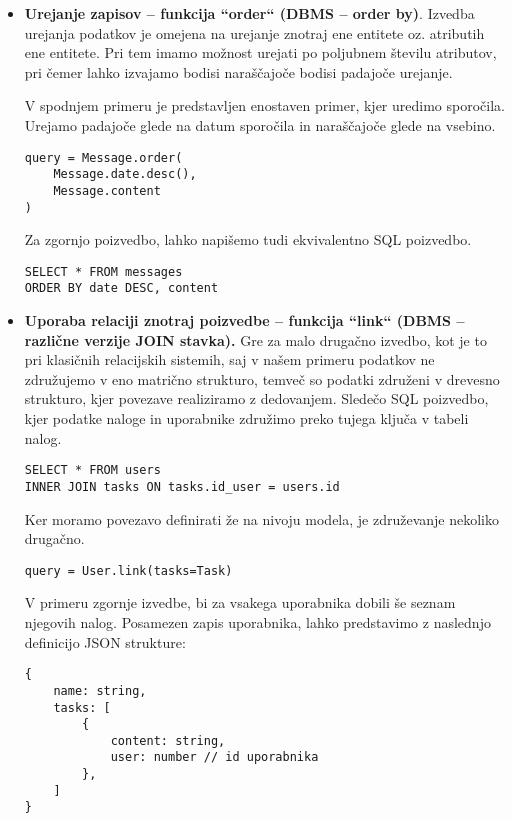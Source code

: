 \documentclass[a4paper,12pt,openright]{book}
\begin{document}
\begin{itemize}
        \item \textbf{Urejanje zapisov – funkcija ``order`` (DBMS – order by)}. 
        \noindent
        Izvedba urejanja podatkov je omejena na urejanje znotraj ene entitete oz. atributih ene entitete. Pri tem imamo možnost urejati po poljubnem številu atributov, pri čemer lahko izvajamo bodisi naraščajoče bodisi padajoče urejanje.

        V spodnjem primeru je predstavljen enostaven primer, kjer uredimo sporočila. Urejamo padajoče glede na datum sporočila in naraščajoče glede na vsebino.

\begin{verbatim}
query = Message.order(
    Message.date.desc(),
    Message.content
)
\end{verbatim}    

        \noindent
        Za zgornjo poizvedbo, lahko napišemo tudi ekvivalentno SQL poizvedbo.

\begin{verbatim}
SELECT * FROM messages
ORDER BY date DESC, content
\end{verbatim}          

        \item \textbf{Uporaba relaciji znotraj poizvedbe – funkcija ``link`` (DBMS – različne verzije JOIN stavka).}
        \noindent
        Gre za malo drugačno izvedbo, kot je to pri klasičnih relacijskih sistemih, saj v našem primeru podatkov ne združujemo v eno matrično strukturo, temveč so podatki združeni v drevesno strukturo, kjer povezave realiziramo z dedovanjem. Sledečo SQL poizvedbo, kjer podatke naloge in uporabnike združimo preko tujega ključa v tabeli nalog.

\begin{verbatim}
SELECT * FROM users
INNER JOIN tasks ON tasks.id_user = users.id
\end{verbatim}

        \noindent
        Ker moramo povezavo definirati že na nivoju modela, je združevanje nekoliko drugačno.

\begin{verbatim}
query = User.link(tasks=Task)
\end{verbatim}

        \noindent
        V primeru zgornje izvedbe, bi za vsakega uporabnika dobili še seznam njegovih nalog. Posamezen zapis uporabnika, lahko predstavimo z naslednjo definicijo JSON strukture:
\begin{verbatim}
{
    name: string,
    tasks: [
        {
            content: string,
            user: number // id uporabnika
        },
    ]
}
\end{verbatim}


\end{itemize}
\end{document}
